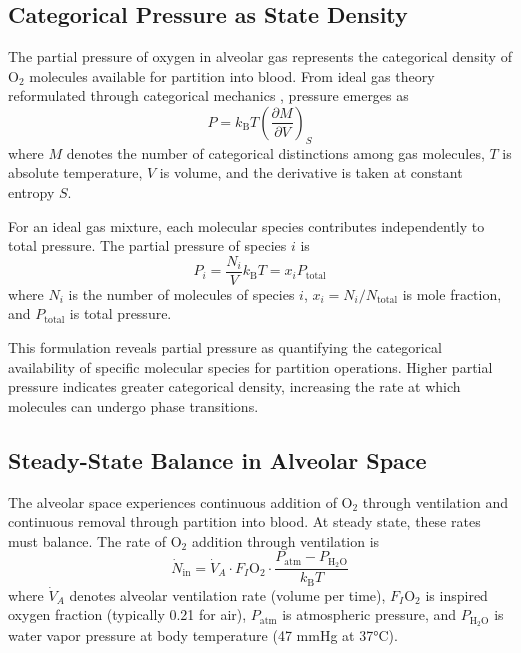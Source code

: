 \documentclass[12pt,a4paper]{article}
\theoremstyle{remark}
\newcommand{\kB}{k_{\mathrm{B}}}
\begin{document}
\subsection{Categorical Pressure as State Density}

The partial pressure of oxygen in alveolar gas represents the categorical density of O$_{2}$ molecules available for partition into blood. From ideal gas theory reformulated through categorical mechanics \cite{sachikonye2024gas}, pressure emerges as
\begin{equation}
P = \kB T \left(\frac{\partial M}{\partial V}\right)_{S}
\end{equation}
where $M$ denotes the number of categorical distinctions among gas molecules, $T$ is absolute temperature, $V$ is volume, and the derivative is taken at constant entropy $S$.

For an ideal gas mixture, each molecular species contributes independently to total pressure. The partial pressure of species $i$ is
\begin{equation}
P_{i} = \frac{N_{i}}{V} \kB T = x_{i} P_{\mathrm{total}}
\end{equation}
where $N_{i}$ is the number of molecules of species $i$, $x_{i} = N_{i}/N_{\mathrm{total}}$ is mole fraction, and $P_{\mathrm{total}}$ is total pressure.

This formulation reveals partial pressure as quantifying the categorical availability of specific molecular species for partition operations. Higher partial pressure indicates greater categorical density, increasing the rate at which molecules can undergo phase transitions.

\subsection{Steady-State Balance in Alveolar Space}

The alveolar space experiences continuous addition of O$_{2}$ through ventilation and continuous removal through partition into blood. At steady state, these rates must balance. The rate of O$_{2}$ addition through ventilation is
\begin{equation}
\dot{N}_{\mathrm{in}} = \dot{V}_{A} \cdot F_{I}\mathrm{O}_{2} \cdot \frac{P_{\mathrm{atm}} - P_{\mathrm{H}_{2}\mathrm{O}}}{\kB T}
\end{equation}
where $\dot{V}_{A}$ denotes alveolar ventilation rate (volume per time), $F_{I}\mathrm{O}_{2}$ is inspired oxygen fraction (typically 0.21 for air), $P_{\mathrm{atm}}$ is atmospheric pressure, and $P_{\mathrm{H}_{2}\mathrm{O}}$ is water vapor pressure at body temperature (47 mmHg at 37°C).
\end{document}
